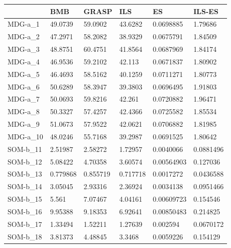 \documentclass[11pt,a4paper]{article}
\begin{document}
	\begin{table}[H]
		\centering
		\begin{tabular}{l|l|l|l|l|l|}
			\cline{2-6}
			& BMB & GRASP & ILS & ES & ILS-ES \\ \hline
			\multicolumn{1}{|l|}{MDG-a\_1} & 49.0739 & 59.0902 & 43.6282 & 0.0698885 & 1.79686 \\ \hline
			\multicolumn{1}{|l|}{MDG-a\_2} & 47.2971 & 58.2082 & 38.9329 & 0.0675791 & 1.84509 \\ \hline
			\multicolumn{1}{|l|}{MDG-a\_3} & 48.8751 & 60.4751 & 41.8564 & 0.0687969 & 1.84174 \\ \hline
			\multicolumn{1}{|l|}{MDG-a\_4} & 46.9536 & 59.2102 & 42.113 & 0.0671837 & 1.80902 \\ \hline
			\multicolumn{1}{|l|}{MDG-a\_5} & 46.4693 & 58.5162 & 40.1259 & 0.0711271 & 1.80773 \\ \hline
			\multicolumn{1}{|l|}{MDG-a\_6} & 50.6289 & 58.3947 & 39.3803 & 0.0696495 & 1.91803 \\ \hline
			\multicolumn{1}{|l|}{MDG-a\_7} & 50.0693 & 59.8216 & 42.261 & 0.0720882 & 1.96471 \\ \hline
			\multicolumn{1}{|l|}{MDG-a\_8} & 50.3327 & 57.4257 & 42.4366 & 0.0725582 & 1.85534 \\ \hline
			\multicolumn{1}{|l|}{MDG-a\_9} & 51.0673 & 57.9522 & 42.0621 & 0.0706882 & 1.81985 \\ \hline
			\multicolumn{1}{|l|}{MDG-a\_10} & 48.0246 & 55.7168 & 39.2987 & 0.0691525 & 1.80642 \\ \hline
			\multicolumn{1}{|l|}{SOM-b\_11} & 2.51987 & 2.58272 & 1.72957 & 0.0040066 & 0.0881496 \\ \hline
			\multicolumn{1}{|l|}{SOM-b\_12} & 5.08422 & 4.70358 & 3.60574 & 0.00564903 & 0.127036 \\ \hline
			\multicolumn{1}{|l|}{SOM-b\_13} & 0.779868 & 0.855719 & 0.717718 & 0.0017272 & 0.0436588 \\ \hline
			\multicolumn{1}{|l|}{SOM-b\_14} & 3.05045 & 2.93316 & 2.36924 & 0.0034138 & 0.0951466 \\ \hline
			\multicolumn{1}{|l|}{SOM-b\_15} & 5.561 & 7.07467 & 4.04161 & 0.00609723 & 0.154546 \\ \hline
			\multicolumn{1}{|l|}{SOM-b\_16} & 9.95388 & 9.18353 & 6.92641 & 0.00850483 & 0.214825 \\ \hline
			\multicolumn{1}{|l|}{SOM-b\_17} & 1.33494 & 1.52211 & 1.27639 & 0.002594 & 0.0670172 \\ \hline
			\multicolumn{1}{|l|}{SOM-b\_18} & 3.81373 & 4.48845 & 3.3468 & 0.0059226 & 0.154129 \\ \hline

\end{tabular}
\end{table}
\end{document}
